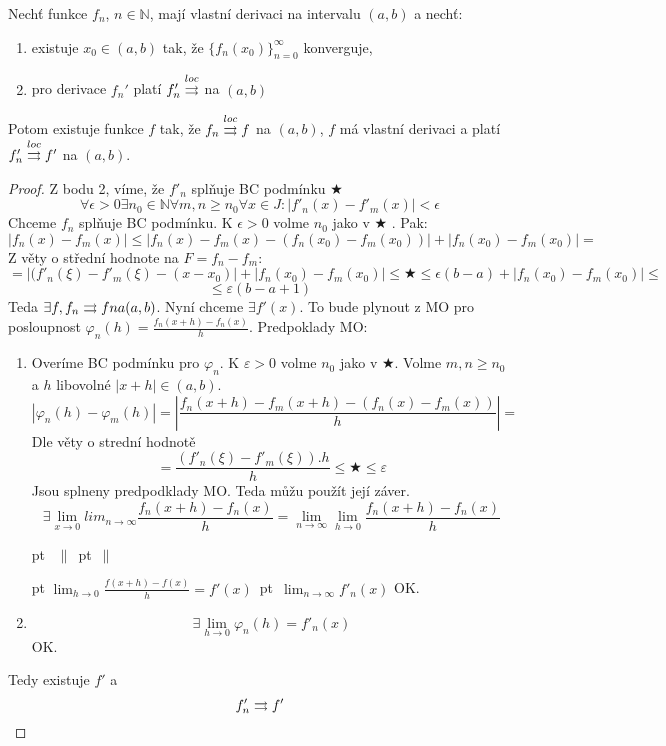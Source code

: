 \begin{vetat}
Nechť funkce $f_n$, $n \in \mathbb{N}$, mají vlastní derivaci na intervalu $(a,b)$ a nechť:
\begin{enumerate}
\item existuje $x_0 \in (a,b)$ tak, že $\{f_n(x_0)\}_{n=0}^{\infty}$ konverguje,
\item pro derivace $f_n'$ platí $f_n' \overset{loc}{\rightrightarrows}$ na $(a,b)$
\end{enumerate}
Potom existuje funkce $f$ tak, že $f_n \overset{loc}{\rightrightarrows} f$ na $(a,b)$, $f$ má vlastní derivaci a platí $f_n' \overset{loc}{\rightrightarrows} f'$ na $(a,b)$.
\end{vetat}
\begin{proof}
Z bodu 2, víme, že $f'_n$ splňuje BC podmínku $\bigstar$ 
$$\forall \epsilon > 0 \exists n_0 \in \mathbb{N} \forall m,n \geq n_0 \forall x \in J: |f'_n(x) - f'_m(x)| < \epsilon $$
Chceme $f_n$ splňuje BC podmínku. K $\epsilon > 0$ volme $n_0$ jako v $\bigstar$ . Pak:
$$|f_n(x) - f_m(x)| \leq |f_n(x) - f_m(x) - (f_n(x_0) - f_m(x_0))| + |f_n(x_0) - f_m(x_0)| =$$
Z věty o střední hodnote na $F = f_n - f_m$:
$$= |(f'_n(\xi) - f'_m(\xi) - (x-x_0)| + |f_n(x_0) - f_m(x_0)| \leq \bigstar \leq \epsilon (b-a) + |f_n(x_0) - f_m(x_0)|\leq $$
$$\leq \varepsilon (b-a+1)$$
Teda $\exists f, f_n \rightrightarrows f na (a,b)$. Nyní chceme $\exists f'(x)$. To bude plynout z MO pro posloupnost $\varphi _n (h) = \frac{f_n(x+h)-f_n(x)}{h}$.
Predpoklady MO:
\begin{enumerate}
\item Overíme BC podmínku pro $\varphi_n$. K $\varepsilon > 0$ volme $n_0$ jako v $\bigstar$. Volme $m,n \geq n_0 $ a $h$ libovolné $|x+h| \in (a,b)$.
$$|\varphi_n(h) - \varphi_m(h)| = |\frac{f_n(x+h) - f_m(x+h) - (f_n(x) - f_m(x))}{h}| = $$
Dle věty o strední hodnotě 
$$ = \frac{(f'_n(\xi) - f'_m(\xi)).h}{h}\leq \bigstar \leq \varepsilon $$
Jsou splneny predpodklady MO. Teda můžu použít její záver.
$$ \exists \lim_{x \to 0} lim_{n \to \infty} \frac{f_n(x+h) - f_n(x)}{h} = \lim_{n \to \infty} \lim_{h \to 0} \frac {f_n(x+h) - f_n(x)}{h}$$

 pt \hbox{ $\parallel$  pt  $\parallel$} \linebreak 

 pt 
\hbox {$ \lim_{h \to 0} \frac{f(x+h) - f(x)}{h} = f'(x)$
 pt 
$ \lim_{n \to \infty} f'_n(x) $} 
\linebreak
OK.
\item $$\exists \lim_{h \to 0} \varphi_n(h) = f'_n(x)$$ OK.
\end{enumerate}
Tedy existuje $f\prime$ a 
$$f'_n \rightrightarrows f' $$
\end{proof}
